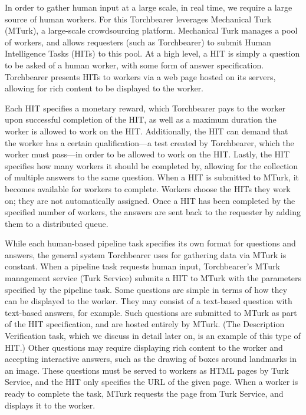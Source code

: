 In order to gather human input at a large scale, in real time, we require a large source of human workers. For this Torchbearer leverages Mechanical Turk (MTurk), a large-scale crowdsourcing platform. Mechanical Turk manages a pool of workers, and allows requesters (such as Torchbearer) to submit Human Intelligence Tasks (HITs) to this pool. At a high level, a HIT is simply a question to be asked of a human worker, with some form of answer specification. Torchbearer presents HITs to workers via a web page hosted on its servers, allowing for rich content to be displayed to the worker.

Each HIT specifies a monetary reward, which Torchbearer pays to the worker upon successful completion of the HIT, as well as a maximum duration the worker is allowed to work on the HIT. Additionally, the HIT can demand that the worker has a certain qualification---a test created by Torchbearer, which the worker must pass---in order to be allowed to work on the HIT.  Lastly, the HIT specifies how many workers it should be completed by, allowing for the collection of multiple answers to the same question. When a HIT is submitted to MTurk, it becomes available for workers to complete. Workers choose the HITs they work on; they are not automatically assigned. Once a HIT has been completed by the specified number of workers, the answers are sent back to the requester by adding them to a distributed queue.

While each human-based pipeline task specifies its own format for questions and answers, the general system Torchbearer uses for gathering data via MTurk is constant. When a pipeline task requests human input, Torchbearer's MTurk management service (Turk Service) submits a HIT to MTurk with the parameters specified by the pipeline task. Some questions are simple in terms of how they can be displayed to the worker. They may consist of a text-based question with text-based answers, for example. Such questions are submitted to MTurk as part of the HIT specification, and are hosted entirely by MTurk. (The Description Verification task, which we discuss in detail later on, is an example of this type of HIT.) Other questions may require displaying rich content to the worker and accepting interactive answers, such as the drawing of boxes around landmarks in an image. These questions must be served to workers as HTML pages by Turk Service, and the HIT only specifies the URL of the given page. When a worker is ready to complete the task, MTurk requests the page from Turk Service, and displays it to the worker.

